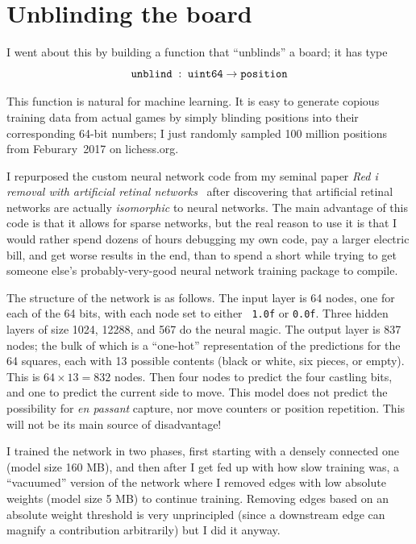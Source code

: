 \documentclass[twocolumn]{amsart}
\begin{document}
\section{Unblinding the board}

I went about this by building a function that ``unblinds'' a board; it
has type
\[
{\tt unblind} \;:\; {\tt uint64} \rightarrow {\tt position}
\]

This function is natural for machine learning. It is easy to generate
copious training data from actual games by simply blinding positions
into their corresponding 64-bit numbers; I just randomly sampled 100
million positions from Feburary~2017 on lichess.org.

I repurposed the custom neural network code from my seminal paper {\it
  Red i removal with artificial retinal networks}~\cite{redi} after
discovering that artificial retinal networks are actually {\em
  isomorphic} to neural networks. The main advantage of this code is
that it allows for sparse networks, but the real reason to use it is
that I would rather spend dozens of hours debugging my own code, pay a
larger electric bill, and get worse results in the end, than to spend
a short while trying to get someone else's probably-very-good neural
network training package to compile.

The structure of the network is as follows. The input layer is 64
nodes, one for each of the 64 bits, with each node set to either {\tt
  1.0f} or {\tt 0.0f}. Three hidden layers of size 1024, 12288, and 567
do the neural magic. The output layer is 837 nodes; the bulk of which
is a ``one-hot'' representation of the predictions for the 64 squares,
each with 13 possible contents (black or white, six pieces, or empty).
This is $64 \times 13 = 832$ nodes. Then four nodes to predict the
four castling bits, and one to predict the current side to move. This
model does not predict the possibility for {\em en passant} capture,
nor move counters or position repetition. This will not be its main
source of disadvantage!

I trained the network in two phases, first starting with a densely
connected one (model size 160 MB), and then after I get fed up with
how slow training was, a ``vacuumed'' version of the network where I
removed edges with low absolute weights (model size 5 MB) to continue
training. Removing edges based on an absolute weight threshold is
very unprincipled (since a downstream edge can magnify a contribution
arbitrarily) but I did it anyway.
\end{document}
